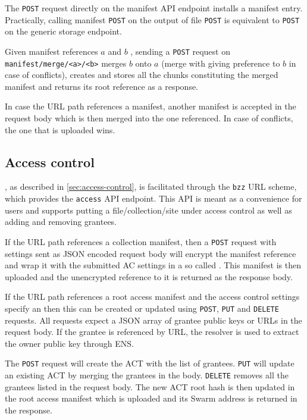 The \lstinline{POST} request directly on the manifest API endpoint installs a manifest entry. Practically, calling manifest     \lstinline{POST} on the output of file \lstinline{POST} is equivalent to \lstinline{POST} on the generic storage endpoint.  

Given manifest references $a$ and $b$ , sending a \lstinline{POST} request on \lstinline{manifest/merge/<a>/<b>} 
merges $b$ onto $a$ (merge with giving preference to $b$ in case of conflicts), creates and stores all the chunks constituting the merged manifest and returns its root reference as a response.


In case the URL path references a manifest, another manifest is accepted in the request body which is then merged into the one referenced. In case of conflicts, the one that is uploaded wins. 


\subsection{Access control \statusgreen}\label{sec:access-control-ux}

, as described in  \ref{sec:access-control}, is facilitated through  the \lstinline{bzz} URL scheme, which provides the \lstinline{access} API endpoint. This API is meant as a convenience for users and supports putting a file/collection/site under access control as well as adding and removing grantees.

If the URL path references a collection manifest, then a \lstinline{POST} request with  settings sent as JSON encoded request body will encrypt the manifest reference and wrap it with the submitted AC settings in a so called . This manifest is then uploaded and the unencrypted reference to it is returned as the response body. 

If the URL path references a root access manifest and the access control settings specify an  then this can be created or updated using \lstinline{POST}, \lstinline{PUT} and \lstinline{DELETE} requests. All requests expect a JSON array of grantee public keys or URLs in the request body. If the grantee is referenced by URL, the resolver is used to extract the owner public key through ENS.

The \lstinline{POST} request will create the ACT with the list of grantees. \lstinline{PUT} will update an existing ACT by merging the grantees in the body. \lstinline{DELETE} removes all the grantees listed in the request body. The new ACT root hash is then updated in the root access manifest which is uploaded and its Swarm address is returned in the response.



